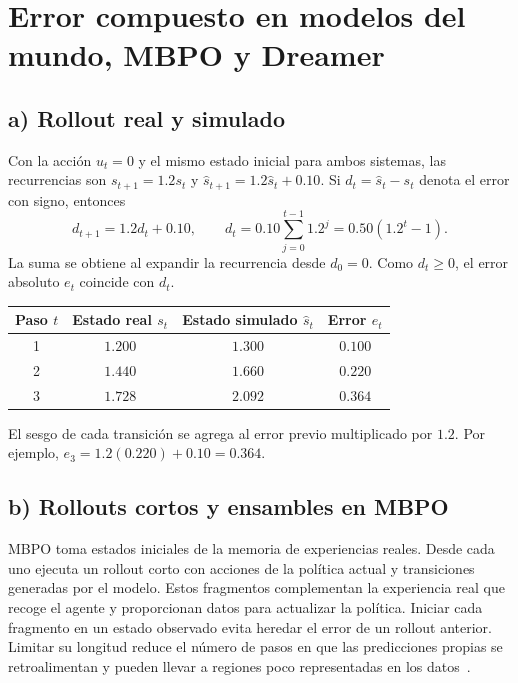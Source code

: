 \section{Error compuesto en modelos del mundo, MBPO y Dreamer}

\subsection*{a) Rollout real y simulado}

Con la acción $u_t=0$ y el mismo estado inicial para ambos sistemas, las
recurrencias son $s_{t+1}=1.2s_t$ y
$\hat{s}_{t+1}=1.2\hat{s}_t+0.10$. Si
$d_t=\hat{s}_t-s_t$ denota el error con signo, entonces
\[
    d_{t+1}=1.2d_t+0.10,
    \qquad
    d_t=0.10\sum_{j=0}^{t-1}1.2^j
       =0.50(1.2^t-1).
\]
La suma se obtiene al expandir la recurrencia desde $d_0=0$. Como
$d_t\geq 0$, el error absoluto $e_t$ coincide con $d_t$.

\begin{center}
    \begin{tabular}{cccc}
        \toprule
        Paso $t$ & Estado real $s_t$ & Estado simulado $\hat{s}_t$
                 & Error $e_t$ \\
        \midrule
        1 & $1.200$ & $1.300$ & $0.100$ \\
        2 & $1.440$ & $1.660$ & $0.220$ \\
        3 & $1.728$ & $2.092$ & $0.364$ \\
        \bottomrule
    \end{tabular}
\end{center}

El sesgo de cada transición se agrega al error previo multiplicado por
$1.2$. Por ejemplo, $e_3=1.2(0.220)+0.10=0.364$.

\subsection*{b) Rollouts cortos y ensambles en MBPO}

MBPO toma estados iniciales de la memoria de experiencias reales. Desde
cada uno ejecuta un rollout corto con acciones de la política actual y
transiciones generadas por el modelo. Estos fragmentos complementan la
experiencia real que recoge el agente y proporcionan datos para
actualizar la política. Iniciar cada fragmento en un estado observado
evita heredar el error de un rollout anterior. Limitar su longitud
reduce el número de pasos en que las predicciones propias se
retroalimentan y pueden llevar a regiones poco representadas en los
datos~\cite[secc.~5]{janner2019}.

